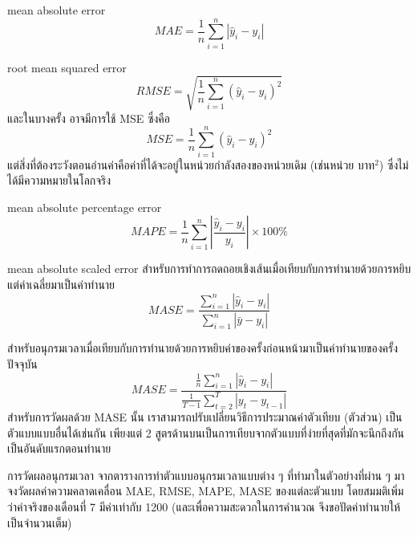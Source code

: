 \begin{definition}
	{mean absolute error}{}
	\[
	MAE = \frac{1}{n}\sum_{i=1}^{n}{|\hat{y}_i - y_i|}
	\]
\end{definition}

\begin{definition}
	{root mean squared error}{}
	\[
	RMSE = \sqrt{\frac{1}{n}\sum_{i=1}^{n}{(\hat{y}_i - y_i)^2}}
	\]
	และในบางครั้ง อาจมีการใช้ MSE ซึ่งคือ
	\[
	MSE = \frac{1}{n}\sum_{i=1}^{n}{(\hat{y}_i - y_i)^2}
	\]
	แต่สิ่งที่ต้องระวังตอนอ่านค่าคือค่าที่ได้จะอยู่ในหน่วยกำลังสองของหน่วยเดิม (เช่นหน่วย $\text{บาท}^2$) ซึ่งไม่ได้มีความหมายในโลกจริง
\end{definition}

\begin{definition}
	{mean absolute percentage error}{}
	\[
	MAPE = \frac{1}{n}\sum_{i=1}^{n}{\left|  \frac{\hat{y}_i - y_i}{y_i} \right|\times 100\% }
	\]
\end{definition}

\begin{definition}
	{mean absolute scaled error}{}
	สำหรับการทำการถดถอยเชิงเส้นเมื่อเทียบกับการทำนายด้วยการหยิบแต่ค่าเฉลี่ยมาเป็นค่าทำนาย
	\[
	MASE = {\frac{\sum_{i=1}^{n}|\hat{y}_i - y_i|}{\sum_{i=1}^{n}|\bar{y}-y_i|}  }
	\]
	
	สำหรับอนุกรมเวลาเมื่อเทียบกับการทำนายด้วยการหยิบค่าของครั้งก่อนหน้ามาเป็นค่าทำนายของครั้งปัจจุบัน
	\[
	MASE = {\frac{\frac{1}{n}\sum_{i=1}^{n}|\hat{y}_i - y_i|}{\frac{1}{T-1}\sum_{t=2}^{T}|y_t - y_{t-1}|}  }
	\]
	สำหรับการวัดผลด้วย MASE นั้น เราสามารถปรับเปลี่ยนวิธีการประมาณค่าตัวเทียบ (ตัวส่วน) เป็นตัวแบบแบบอื่นได้เช่นกัน เพียงแต่ 2 สูตรด้านบนเป็นการเทียบจากตัวแบบที่ง่ายที่สุดที่มักจะนึกถึงกันเป็นอันดับแรกตอนทำนาย
\end{definition}
\newpage
\begin{example}
	{การวัดผลอนุกรมเวลา}{}
	จากตารางการทำตัวแบบอนุกรมเวลาแบบต่าง ๆ ที่ทำมาในตัวอย่างที่ผ่าน ๆ มา จงวัดผลค่าความคลาดเคลื่อน MAE, RMSE, MAPE, MASE ของแต่ละตัวแบบ โดยสมมติเพิ่มว่าค่าจริงของเดือนที่ 7 มีค่าเท่ากับ 1200 (และเพื่อความสะดวกในการคำนวณ จึงขอปัดค่าทำนายให้เป็นจำนวนเต็ม)
\end{example}


